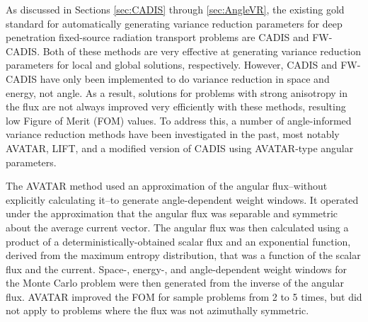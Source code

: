 As discussed in Sections \ref{sec:CADIS}
through \ref{sec:AngleVR}, the existing gold standard for automatically
generating variance reduction parameters for deep penetration
fixed-source radiation transport problems are
CADIS and FW-CADIS. Both of these methods are very effective at
generating variance reduction parameters for local and global solutions,
respectively. However, CADIS and FW-CADIS have only been implemented to
do variance reduction in space and energy, not angle. 
As a result, solutions for problems with
strong anisotropy in the flux are not always improved very efficiently with these methods,
resulting low Figure of Merit (FOM) values.
To address this, a number of angle-informed variance reduction
methods have been
investigated in the past, most notably AVATAR, LIFT, and a modified version of
CADIS using AVATAR-type angular parameters.

The AVATAR method
\cite{van_riper_generation_1995, van_riper_avatarautomatic_1997} used an
approximation of the angular flux--without explicitly calculating it--to
generate angle-dependent weight windows. It operated under the approximation
that
the angular flux was separable and symmetric about the average current vector.
The angular flux was then calculated using
a product of a deterministically-obtained
scalar flux and an exponential function, derived from the
maximum entropy distribution, that was a function of the scalar flux and the
current. Space-, energy-, and angle-dependent weight windows for
the Monte Carlo problem were then generated from the inverse of the angular
flux. AVATAR improved the FOM for sample problems from 2 to 5 times, but did not
apply to problems where the flux was not azimuthally symmetric.

